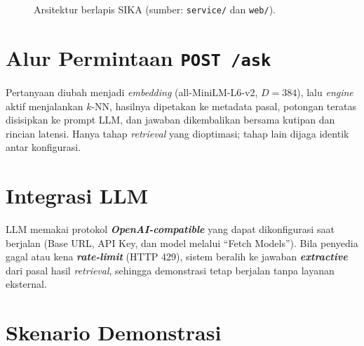 \documentclass[12pt,a4paper,oneside]{report}
\newcommand{\keyword}[1]{\textbf{\textit{#1}}}
\begin{document}
\begin{figure}[H]
\centering
{}
\caption{Arsitektur berlapis SIKA (sumber: \texttt{service/} dan \texttt{web/}).}
\label{fig:arsitektur}
\end{figure}

\section{Alur Permintaan \texttt{POST /ask}}

Pertanyaan diubah menjadi \textit{embedding} (all-MiniLM-L6-v2, $D=384$), lalu \textit{engine} aktif menjalankan $k$-NN, hasilnya dipetakan ke metadata pasal, potongan teratas disisipkan ke prompt LLM, dan jawaban dikembalikan bersama kutipan dan rincian latensi. Hanya tahap \textit{retrieval} yang dioptimasi; tahap lain dijaga identik antar konfigurasi.

\section{Integrasi LLM}

LLM memakai protokol \keyword{OpenAI-compatible} yang dapat dikonfigurasi saat berjalan (Base URL, API Key, dan model melalui ``Fetch Models''). Bila penyedia gagal atau kena \keyword{rate-limit} (HTTP 429), sistem beralih ke jawaban \keyword{extractive} dari pasal hasil \textit{retrieval}, sehingga demonstrasi tetap berjalan tanpa layanan eksternal.

\section{Skenario Demonstrasi}
\end{document}
